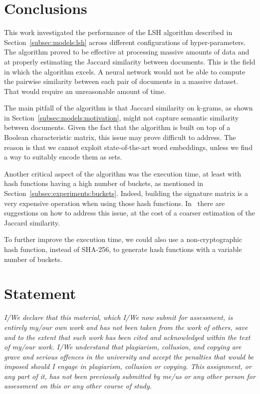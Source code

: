\documentclass[runningheads]{llncs}
\begin{document}
\section{Conclusions}
\label{sec:conclusions}

This work investigated the performance of the LSH algorithm described in Section~\ref{subsec:models:lsh} across different configurations of hyper-parameters. The algorithm proved to be effective at processing massive amounts of data and at properly estimating the Jaccard similarity between documents. This is the field in which the algorithm excels. A neural network would not be able to compute the pairwise similarity between each pair of documents in a massive dataset. That would require an unreasonable amount of time.

The main pitfall of the algorithm is that Jaccard similarity on k-grams, as shown in Section~\ref{subsec:models:motivation}, might not capture semantic similarity between documents. Given the fact that the algorithm is built on top of a Boolean characteristic matrix, this issue may prove difficult to address. The reason is that we cannot exploit state-of-the-art word embeddings, unless we find a way to suitably encode them as sets.

Another critical aspect of the algorithm was the execution time, at least with hash functions having a high number of buckets, as mentioned in Section~\ref{subsec:experiments:buckets}. Indeed, building the signature matrix is a very expensive operation when using those hash functions. In~\cite{leskovec_2020} there are suggestions on how to address this issue, at the cost of a coarser estimation of the Jaccard similarity.

To further improve the execution time, we could also use a non-cryptographic hash function, instead of SHA-256, to generate hash functions with a variable number of buckets.

\section*{Statement}
\textit{I/We declare that this material,
which I/We now submit for assessment, is entirely my/our own work and has not been
taken from the work of others, save and to the extent that such work has been cited and
acknowledged within the text of my/our work. I/We understand that plagiarism, collusion,
and copying are grave and serious offences in the university and accept the penalties that
would be imposed should I engage in plagiarism, collusion or copying. This assignment,
or any part of it, has not been previously submitted by me/us or any other person for
assessment on this or any other course of study.}




\end{document}
